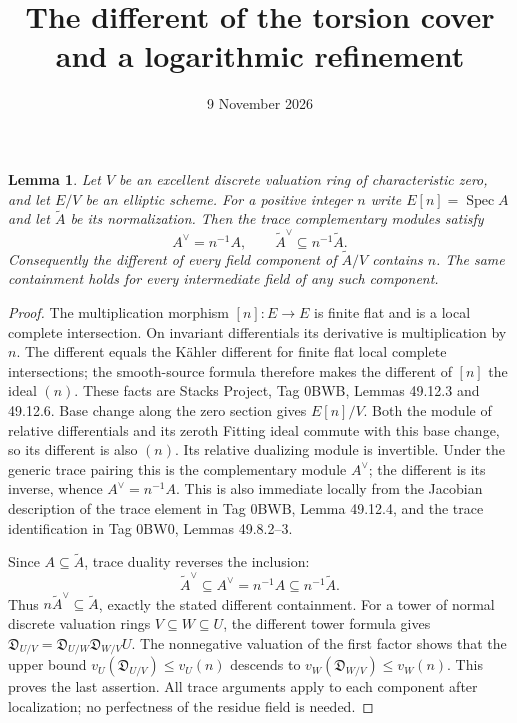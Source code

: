 \documentclass[11pt]{article}
\newtheorem{lemma}{Lemma}\newtheorem{proposition}{Proposition}
\begin{document}
\title{The different of the torsion cover and a logarithmic refinement}
\author{}\date{9 November 2026}\maketitle

\begin{lemma}
Let $V$ be an excellent discrete valuation ring of characteristic zero,
and let $E/V$ be an elliptic scheme. For a positive integer $n$ write
$E[n]=\operatorname{Spec} A$ and let $\widetilde A$ be its normalization.
Then the trace complementary modules satisfy
\[
 A^\vee=n^{-1}A,\qquad
 \widetilde A^\vee\subseteq n^{-1}\widetilde A.
\]
Consequently the different of every field component of
$\widetilde A/V$ contains $n$. The same containment holds for every
intermediate field of any such component.
\end{lemma}
\begin{proof}
The multiplication morphism $[n]:E\to E$ is finite flat and is a
local complete intersection. On invariant differentials its derivative
is multiplication by $n$. The different equals the K\"ahler different
for finite flat local complete intersections; the smooth-source formula
therefore makes the different of $[n]$ the ideal $(n)$.
These facts are Stacks Project, Tag 0BWB, Lemmas 49.12.3 and 49.12.6.
Base change along the zero section gives $E[n]/V$. Both the module of
relative differentials and its zeroth Fitting ideal commute with this
base change, so its different is also $(n)$. Its relative dualizing
module is invertible. Under the generic trace pairing this is the
complementary module $A^\vee$; the different is its inverse, whence
$A^\vee=n^{-1}A$. This is also immediate locally from the Jacobian
description of the trace element in Tag 0BWB, Lemma 49.12.4, and the
trace identification in Tag 0BW0, Lemmas 49.8.2--3.

Since $A\subseteq\widetilde A$, trace duality reverses the inclusion:
\[
 \widetilde A^\vee\subseteq A^\vee=n^{-1}A
                         \subseteq n^{-1}\widetilde A.
\]
Thus $n\widetilde A^\vee\subseteq\widetilde A$, exactly the stated
different containment. For a tower of normal discrete valuation rings
$V\subseteq W\subseteq U$, the different tower formula gives
$\mathfrak D_{U/V}=\mathfrak D_{U/W}\mathfrak D_{W/V}U$.
The nonnegative valuation of the first factor shows that the upper
bound $v_U(\mathfrak D_{U/V})\le v_U(n)$ descends to
$v_W(\mathfrak D_{W/V})\le v_W(n)$. This proves the last assertion.
All trace arguments apply to each component after localization; no
perfectness of the residue field is needed.
\end{proof}
\end{document}
